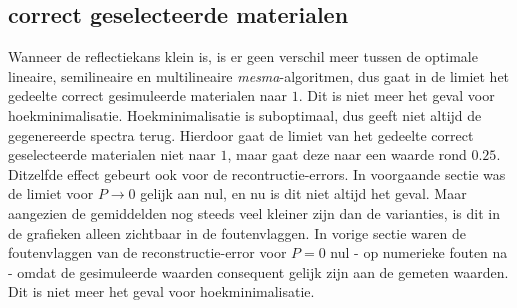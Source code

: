 \documentclass[12pt]{report}
\begin{document}
\subsection{correct geselecteerde materialen}
Wanneer de reflectiekans klein is, is er geen verschil meer tussen de optimale lineaire, semilineaire en multilineaire \textit{mesma}-algoritmen, dus gaat in de limiet het gedeelte correct gesimuleerde materialen naar $1$. Dit is niet meer het geval voor hoekminimalisatie. Hoekminimalisatie is suboptimaal, dus geeft niet altijd de gegenereerde spectra terug. Hierdoor gaat de limiet van het gedeelte correct geselecteerde materialen niet naar $1$, maar gaat deze naar een waarde rond $0.25$. Ditzelfde effect gebeurt ook voor de recontructie-errors. In voorgaande sectie was de limiet voor $P \rightarrow 0$ gelijk aan nul, en nu is dit niet altijd het geval. Maar aangezien de gemiddelden nog steeds veel kleiner zijn dan de varianties, is dit in de grafieken alleen zichtbaar in de foutenvlaggen. In vorige sectie waren de foutenvlaggen van de reconstructie-error voor $P=0$ nul - op numerieke fouten na - omdat de gesimuleerde waarden consequent gelijk zijn aan de gemeten waarden. Dit is niet meer het geval voor hoekminimalisatie. 
\end{document}
